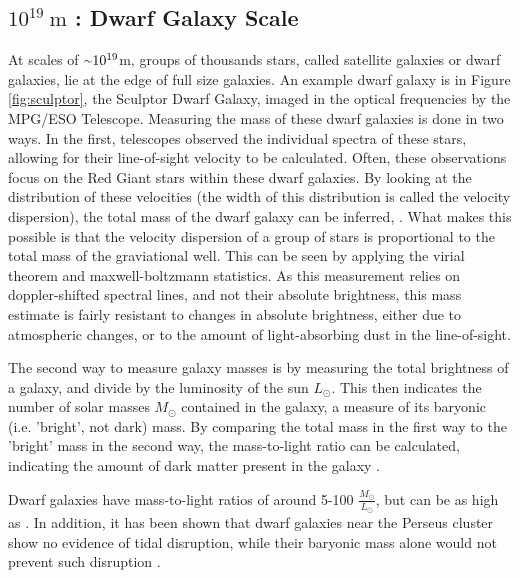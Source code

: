   \subsection{$10^{19}\:\text{m}$ : Dwarf Galaxy Scale}
    At scales of $\nicetilde 10^{19}$m, groups of thousands stars, called satellite galaxies or dwarf galaxies, lie at the edge of full size galaxies.
    An example dwarf galaxy is in Figure \ref{fig:sculptor}, the Sculptor Dwarf Galaxy, imaged in the optical frequencies by the MPG/ESO Telescope.
    Measuring the mass of these dwarf galaxies is done in two ways.
    In the first, telescopes observed the individual spectra of these stars, allowing for their line-of-sight velocity to be calculated.
    Often, these observations focus on the Red Giant stars within these dwarf galaxies\cite{dwarf_gal_red_giant}.
    By looking at the distribution of these velocities (the width of this distribution is called the velocity dispersion), the total mass of the dwarf galaxy can be inferred\cite{dwarf_gal_vel_dispersion}, \cite{dwarf_gal_vel_dispersion2}.
    What makes this possible is that the velocity dispersion of a group of stars is proportional to the total mass of the graviational well.
    This can be seen by applying the virial theorem and maxwell-boltzmann statistics.
    As this measurement relies on doppler-shifted spectral lines, and not their absolute brightness, this mass estimate is fairly resistant to changes in absolute brightness, either due to atmospheric changes, or to the amount of light-absorbing dust in the line-of-sight.
    
    The second way to measure galaxy masses is by measuring the total brightness of a galaxy, and divide by the luminosity of the sun $L_\odot$.
    This then indicates the number of solar masses $M_\odot$ contained in the galaxy, a measure of its baryonic (i.e. 'bright', not dark) mass.
    By comparing the total mass in the first way to the 'bright' mass in the second way, the mass-to-light ratio can be calculated, indicating the amount of dark matter present in the galaxy \cite{faber_ml}.
    
    Dwarf galaxies have mass-to-light ratios of around 5-100 $\frac{M_\odot}{L_\odot}$, but can be as high as  \cite{Simon2007_dwarfgalaxykeck}.
    In addition, it has been shown that dwarf galaxies near the Perseus cluster show no evidence of tidal disruption, while their baryonic mass alone would not prevent such disruption \cite{Penny2009}.

